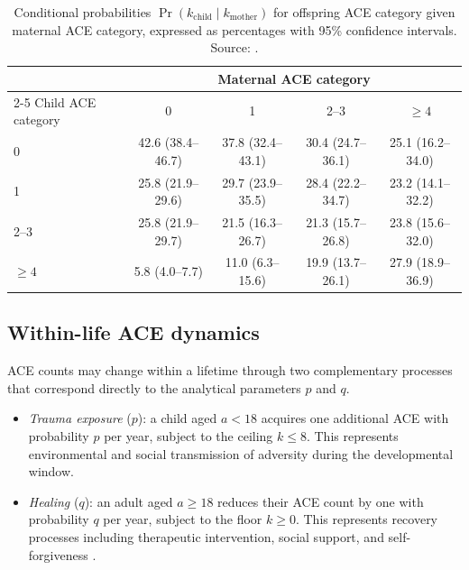 \documentclass{article}
\begin{document}
\begin{table}[!htbp]
    \centering
    \caption{Conditional probabilities \(\Pr(k_{\text{child}} \mid k_{\text{mother}})\)
    for offspring ACE category given maternal ACE category, expressed as percentages
    with 95\% confidence intervals. Source: \cite{schickedanz2021intergenerational}.}
    \label{tab:intergenerational}
    \begin{tabular}{lcccc}
        \toprule
        & \multicolumn{4}{c}{Maternal ACE category} \\
        \cmidrule(lr){2-5}
        Child ACE category & 0 & 1 & 2--3 & \(\geq 4\) \\
        \midrule
        0       & 42.6 (38.4--46.7) & 37.8 (32.4--43.1) & 30.4 (24.7--36.1) & 25.1 (16.2--34.0) \\
        1       & 25.8 (21.9--29.6) & 29.7 (23.9--35.5) & 28.4 (22.2--34.7) & 23.2 (14.1--32.2) \\
        2--3    & 25.8 (21.9--29.7) & 21.5 (16.3--26.7) & 21.3 (15.7--26.8) & 23.8 (15.6--32.0) \\
        \(\geq 4\) & 5.8 (4.0--7.7)  & 11.0 (6.3--15.6)  & 19.9 (13.7--26.1) & 27.9 (18.9--36.9) \\
        \bottomrule
    \end{tabular}
\end{table}

\subsection*{Within-life ACE dynamics}

ACE counts may change within a lifetime through two complementary processes
that correspond directly to the analytical parameters \(p\) and \(q\).

\begin{itemize}
    \item \emph{Trauma exposure} (\(p\)): a child aged \(a < 18\) acquires one
    additional ACE with probability \(p\) per year, subject to the ceiling
    \(k \leq 8\).  This represents environmental and social transmission of
    adversity during the developmental window.
    \item \emph{Healing} (\(q\)): an adult aged \(a \geq 18\) reduces their ACE
    count by one with probability \(q\) per year, subject to the floor \(k \geq 0\).
    This represents recovery processes including therapeutic intervention,
    social support, and self-forgiveness
    \cite{skolnick2023association,trauma_recovery_processes}.
\end{itemize}
\end{document}
